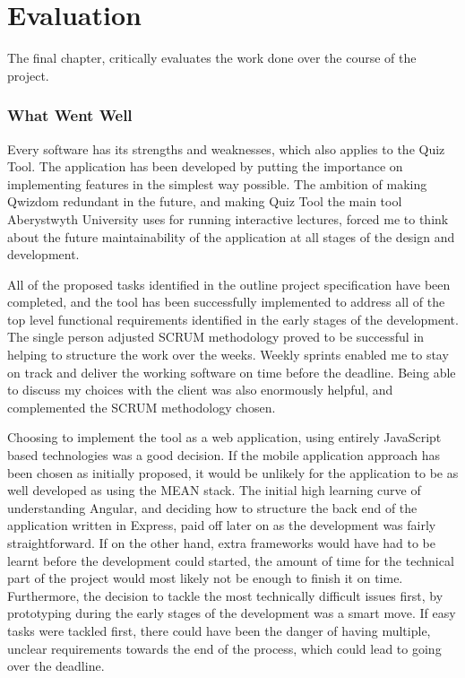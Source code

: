 \chapter{Evaluation}

The final chapter, critically evaluates the work done over the course of the project.

\subsection{What Went Well}
Every software has its strengths and weaknesses, which also applies to the Quiz Tool.
The application has been developed by putting the importance on implementing
features in the simplest way possible. The ambition of making Qwizdom redundant
in the future, and making Quiz Tool the main tool Aberystwyth University uses
for running interactive lectures, forced me to think about the future maintainability
of the application at all stages of the design and development.

All of the proposed tasks identified in the outline project specification have been
completed, and the tool has been successfully implemented to address all of the
top level functional requirements identified in the early stages of the development.
The single person adjusted SCRUM methodology proved to be successful in helping
to structure the work over the weeks. Weekly sprints enabled me to stay on track
and deliver the working software on time before the deadline. Being able to discuss
my choices with the client was also enormously helpful, and complemented the
SCRUM methodology chosen.

Choosing to implement the tool as a web application, using entirely JavaScript
based technologies was a good decision. If the mobile application approach has
been chosen as initially proposed, it would be unlikely for the application to be
as well developed as using the MEAN stack. The initial high learning curve of
understanding Angular, and deciding how to structure the back end of the application
written in Express, paid off later on as the development was fairly straightforward.
If on the other hand, extra frameworks would have had to be learnt before the development
could started, the amount of time for the technical part of the project would most
likely not be enough to finish it on time. Furthermore, the decision to tackle the most technically
difficult issues first, by prototyping during the early stages of the development
was a smart move. If easy tasks were tackled first, there could have been the
danger of having multiple, unclear requirements towards the end of the process, which
could lead to going over the deadline.

